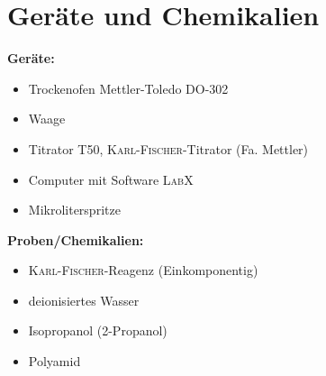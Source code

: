\newpage
\section{Geräte und Chemikalien}
\label{sec:geraete}

\textbf{Geräte:}
\begin{itemize}
\item Trockenofen Mettler-Toledo DO-302
\item Waage
\item Titrator T50, \textsc{Karl-Fischer}-Titrator (Fa. Mettler)
\item Computer mit Software \textsc{LabX}
\item Mikroliterspritze
\end{itemize}

\vspace*{5mm}

\textbf{Proben/Chemikalien:}
\begin{itemize}
\item \textsc{Karl-Fischer}-Reagenz (Einkomponentig)
\item deionisiertes Wasser
\item Isopropanol (2-Propanol)
\item Polyamid

\end{itemize}





